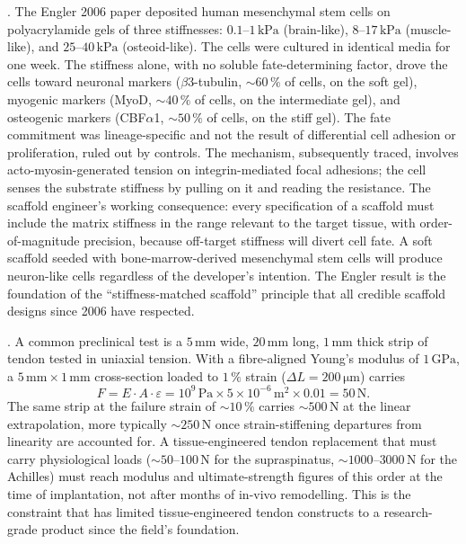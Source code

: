 . The
Engler 2006 paper deposited human mesenchymal stem cells on
polyacrylamide gels of three stiffnesses: $0.1$--$1\,\text{kPa}$
(brain-like), $8$--$17\,\text{kPa}$ (muscle-like), and
$25$--$40\,\text{kPa}$ (osteoid-like). The cells were cultured in
identical media for one week. The stiffness alone, with no soluble
fate-determining factor, drove the cells toward neuronal markers
($\beta$3-tubulin, $\sim 60\,\%$ of cells, on the soft gel), myogenic
markers (MyoD, $\sim 40\,\%$ of cells, on the intermediate gel), and
osteogenic markers (CBF$\alpha$1, $\sim 50\,\%$ of cells, on the
stiff gel). The fate commitment was lineage-specific and not the
result of differential cell adhesion or proliferation, ruled out by
controls. The mechanism, subsequently traced, involves
acto-myosin-generated tension on integrin-mediated focal adhesions;
the cell senses the substrate stiffness by pulling on it and reading
the resistance. The scaffold engineer's working consequence: every
specification of a scaffold must include the matrix stiffness in the
range relevant to the target tissue, with order-of-magnitude
precision, because off-target stiffness will divert cell fate. A
soft scaffold seeded with bone-marrow-derived mesenchymal stem cells
will produce neuron-like cells regardless of the developer's
intention. The Engler result is the foundation of the
``stiffness-matched scaffold'' principle that all credible scaffold
designs since 2006 have respected.

. A common preclinical test is a $5\,\text{mm}$
wide, $20\,\text{mm}$ long, $1\,\text{mm}$ thick strip of tendon
tested in uniaxial tension. With a fibre-aligned Young's modulus of
$1\,\text{GPa}$, a $5\,\text{mm} \times 1\,\text{mm}$ cross-section
loaded to $1\,\%$ strain ($\Delta L = 200\,\si{\micro\meter}$) carries
\[
F = E \cdot A \cdot \varepsilon
  = 10^{9}\,\text{Pa} \times 5 \times 10^{-6}\,\text{m}^2 \times 0.01
  = 50\,\text{N}.
\]
The same strip at the failure strain of $\sim 10\,\%$ carries
$\sim 500\,\text{N}$ at the linear extrapolation, more typically
$\sim 250\,\text{N}$ once strain-stiffening departures from
linearity are accounted for. A tissue-engineered tendon replacement
that must carry physiological loads ($\sim 50$--$100\,\text{N}$ for
the supraspinatus, $\sim 1000$--$3000\,\text{N}$ for the Achilles)
must reach modulus and ultimate-strength figures of this order at
the time of implantation, not after months of in-vivo remodelling.
This is the constraint that has limited tissue-engineered tendon
constructs to a research-grade product since the field's foundation.

